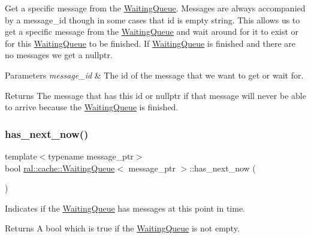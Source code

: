 Get a specific message from the \hyperlink{classral_1_1cache_1_1WaitingQueue}{Waiting\+Queue}. Messages are always accompanied by a message\+\_\+id though in some cases that id is empty string. This allows us to get a specific message from the \hyperlink{classral_1_1cache_1_1WaitingQueue}{Waiting\+Queue} and wait around for it to exist or for this \hyperlink{classral_1_1cache_1_1WaitingQueue}{Waiting\+Queue} to be finished. If \hyperlink{classral_1_1cache_1_1WaitingQueue}{Waiting\+Queue} is finished and there are no messages we get a nullptr. 
\begin{DoxyParams}{Parameters}
{\em message\+\_\+id} & The id of the message that we want to get or wait for. \\
\hline
\end{DoxyParams}
\begin{DoxyReturn}{Returns}
The message that has this id or nullptr if that message will never be able to arrive because the \hyperlink{classral_1_1cache_1_1WaitingQueue}{Waiting\+Queue} is finished. 
\end{DoxyReturn}
\mbox{\label{classral_1_1cache_1_1WaitingQueue_ac365aaf9f942c2d5ac22087cbfaf5968}} 
\subsubsection{\texorpdfstring{has\+\_\+next\+\_\+now()}{has\_next\_now()}}
{\footnotesize\ttfamily template$<$typename message\+\_\+ptr$>$ \\
bool \hyperlink{classral_1_1cache_1_1WaitingQueue}{ral\+::cache\+::\+Waiting\+Queue}$<$ message\+\_\+ptr $>$\+::has\+\_\+next\+\_\+now (\begin{DoxyParamCaption}{ }\end{DoxyParamCaption})\hspace{0.3cm}{\ttfamily [inline]}}

Indicates if the \hyperlink{classral_1_1cache_1_1WaitingQueue}{Waiting\+Queue} has messages at this point in time. \begin{DoxyReturn}{Returns}
A bool which is true if the \hyperlink{classral_1_1cache_1_1WaitingQueue}{Waiting\+Queue} is not empty. 
\end{DoxyReturn}
\mbox{\label{classral_1_1cache_1_1WaitingQueue_a33631ea402ae98a42b144bc3f1453341}} 
